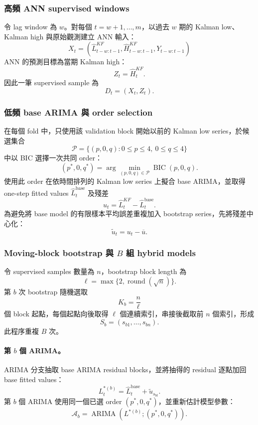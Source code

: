 \subsubsection{高頻 ANN supervised windows}
令 lag window 為 $w$。對每個 $t=w+1,\ldots,m$，以過去 $w$ 期的 Kalman low、Kalman high 與原始觀測建立 ANN 輸入：
\[
    X_t=(
    \widehat L_{t-w:t-1}^{KF},
    \widehat H_{t-w:t-1}^{KF},
    Y_{t-w:t-1}
    )
\]
ANN 的預測目標為當期 Kalman high：
\[
    Z_t=\widehat H_t^{KF}.
\]
因此一筆 supervised sample 為
\[
    D_t=(X_t,Z_t).
\]

\subsubsection{低頻 base ARIMA 與 order selection}

在每個 fold 中，只使用該 validation block 開始以前的 Kalman low series，於候選集合
\[
    \mathcal P=\{(p,0,q):0\leq p\leq4,\ 0\leq q\leq4\}
\]
中以 BIC 選擇一次共同 order：
\[
    (p^\ast,0,q^\ast)
    =\arg\min_{(p,0,q)\in\mathcal P}\operatorname{BIC}(p,0,q).
\]
使用此 order 在依時間排列的 Kalman low series 上擬合 base ARIMA，並取得 one-step fitted values $\widehat L_t^{\mathrm{base}}$ 及殘差
\[
    u_t=\widehat L_t^{KF}-\widehat L_t^{\mathrm{base}}.
\]
為避免將 base model 的有限樣本平均誤差重複加入 bootstrap series，先將殘差中心化：
\[
    \widetilde u_t=u_t-\overline u.
\]

\subsubsection{Moving-block bootstrap 與 $B$ 組 hybrid models}

令 supervised samples 數量為 $n$，bootstrap block length 為
\[
    \ell=\max\{2,\operatorname{round}(\sqrt n)\}.
\]
第 $b$ 次 bootstrap 隨機選取
\[
    K_b=\frac{n}{\ell}
\]
個 block 起點，每個起點向後取得 $\ell$ 個連續索引，串接後截取前 $n$ 個索引，形成
\[
    S_b=(s_{b1},\ldots,s_{bn}).
\]
此程序重複 $B$ 次。

\paragraph{第 $b$ 個 ARIMA。}

ARIMA 分支抽取 base ARIMA residual blocks，並將抽得的 residual 逐點加回 base fitted values：
\[
    L_t^{\ast(b)}
    =\widehat L_t^{\mathrm{base}}+\widetilde u_{s_{bt}}.
\]
第 $b$ 個 ARIMA 使用同一個已選 order $(p^\ast,0,q^\ast)$，並重新估計模型參數：
\[
    \mathcal A_b
    =\operatorname{ARIMA}\!\left(L^{\ast(b)};(p^\ast,0,q^\ast)\right).
\]

